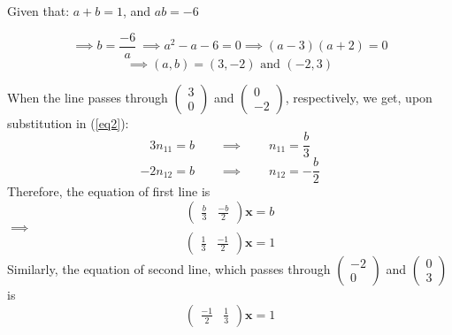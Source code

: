 \documentclass[12pt]{article}
\begin{document}
\noindent
Given that: \qquad \quad $ a + b = 1 $, \qquad and \qquad \quad $ ab = -6$ 

\begin{equation*}
\implies b = \frac{-6}{a} \  
\implies a^2 - a -6 =0
\implies (a-3)(a+2)=0
\end{equation*}
\begin{equation}
	\implies (a,b)=(3,-2) \text{ and } (-2,3)
\end{equation}

\noindent
When the line passes through 
$\displaystyle
\begin{pmatrix}
	3 \\ 0
\end{pmatrix}$
and 
$\displaystyle
\begin{pmatrix}
	0 \\ -2
\end{pmatrix}$, respectively,
we get, upon substitution in (\ref{eq2}):
	\[ 3 n_{11} = b \qquad \implies \qquad n_{11} = \frac{b}{3} \]
	\[-2 n_{12} = b \qquad \implies \qquad n_{12} =-\frac{b}{2} \]
Therefore, the equation of first line is
\begin{equation*}
\begin{pmatrix}
	\displaystyle \frac{b}{3} &
	\displaystyle \frac{-b}{2}
\end{pmatrix}
	{\mathbf{x}} = b
\end{equation*}
%
$\implies$
\begin{equation}
\begin{pmatrix}
	\displaystyle \frac{1}{3} &
	\displaystyle \frac{-1}{2}
\end{pmatrix}
	{\mathbf{x}} = 1
\end{equation}
Similarly, the equation of second line, which passes through 
$\displaystyle
\begin{pmatrix}
	-2 \\ 0
\end{pmatrix}$
and 
$\displaystyle
\begin{pmatrix}
	0 \\ 3
\end{pmatrix}$
is 
\begin{equation}
\begin{pmatrix}
	\displaystyle \frac{-1}{2} &
	\displaystyle \frac{1}{3}
\end{pmatrix}
	{\mathbf{x}} = 1
\end{equation}


\end{document}

